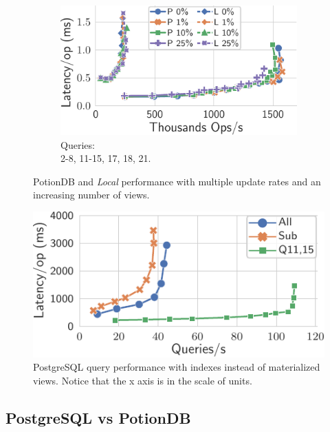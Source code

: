 \documentclass[sigplan,twocolumn,review,anonymous]{acmart}
\begin{document}
\begin{figure}
\begin{minipage}{.58\linewidth}
\begin{subfigure}{.32\linewidth}
		\includegraphics[width=1\linewidth]{queryScale/15Ops}
		\caption{Queries:\\\hspace{\textwidth} 2-8, 11-15, 17, 18, 21.}
		\label{fig:15Q}
	\end{subfigure}%
	\vspace*{-0.65em}
	\caption{PotionDB and \emph{Local}  performance with multiple update rates and an increasing number of views.}
	\label{fig:queryScaleUpds}
	\vspace*{-0.2em}
	\end{minipage}%
	\hspace*{0.05\linewidth}
	\begin{minipage}{.34\linewidth}
		\centering
		\includegraphics[width=0.8\linewidth]{postgres/postgresNoView}
		\caption{PostgreSQL query performance with indexes instead of materialized views. Notice that the x axis is in the scale of units.}
		\label{fig:postgresNoViews}
	\end{minipage}
\end{figure}

\subsection{PostgreSQL vs PotionDB}
\end{document}
